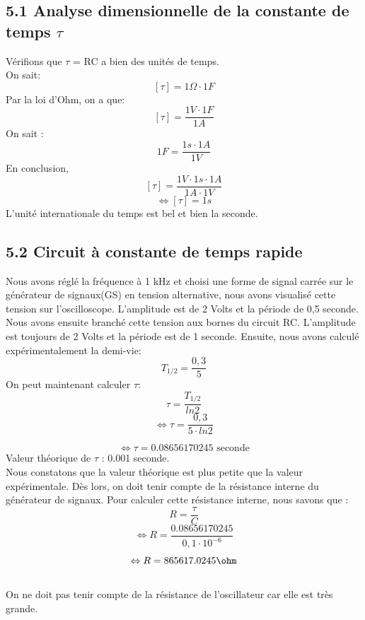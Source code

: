 \documentclass{report}
\begin{document}
\subsection*{5.1 Analyse dimensionnelle de la constante de temps $\tau$ }
V\'erifions que $\tau$ = RC a bien des unit\'es de temps.
\\
On sait:
   $$[\tau] = 1\Omega \cdot 1F$$
Par la loi d'Ohm, on a que:
   $$[\tau] = \frac{1V \cdot 1F}{1A}$$
On sait :
   $$1F = \frac{1s \cdot 1A}{1V}$$
En conclusion,
   $$[\tau] = \frac{1V \cdot 1s \cdot 1A}{1A \cdot 1V}$$
  $$\Leftrightarrow [\tau] = 1s$$
L'unit\'e internationale du temps est bel et bien la seconde.
\subsection*{5.2 Circuit \`a constante de temps rapide}
\hspace*{0.5cm}
Nous avons réglé la fr\'equence \`a 1 kHz et choisi une forme de signal carr\'ee sur le g\'en\'erateur de signaux(GS) en tension alternative, nous avons visualis\'e cette tension sur l'oscilloscope.
L'amplitude est de 2 Volts et la p\'eriode de 0,5 seconde.
Nous avons ensuite branch\'e cette tension aux bornes du circuit RC. 
L'amplitude est toujours de 2 Volts et la p\'eriode est de 1 seconde.
Ensuite, nous avons calcul\'e exp\'erimentalement la demi-vie:
\begin{equation}
   T_{1/2} = \frac{0,3}{5}
\end{equation}
On peut maintenant calculer $\tau$:
\begin{equation}
   \tau = \frac{T_{1/2}}{ln2}
\end{equation}
\begin{equation}
   \Leftrightarrow \tau = \frac{0,3}{5 \cdot ln2} 
\end{equation}

\begin{equation}
   \Leftrightarrow \tau = 0.08656170245 \text{ seconde} 
\end{equation}
Valeur th\'eorique de $\tau$ : 0.001 seconde.
\\
Nous constatons que la valeur th\'eorique est plus petite que la valeur exp\'erimentale. D\`es lors, on doit tenir compte de la r\'esistance interne du g\'en\'erateur de signaux.
Pour calculer cette r\'esistance interne, nous savons que :
\begin{equation}
   R = \frac{\tau}{C} 
\end{equation}
\begin{equation}
  \Leftrightarrow R = \frac{0.08656170245}{0,1 \cdot 10^{-6}} 
\end{equation}
\begin{equation}
  \Leftrightarrow R = 865617.0245 \ohm
\end{equation}
\\ On ne  doit pas tenir compte de la résistance de l'oscillateur car elle est très grande.
\end{document}
